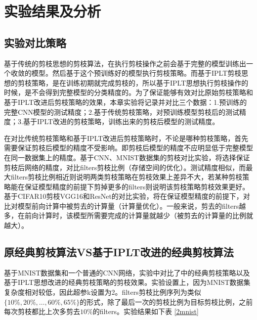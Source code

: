\documentclass[ pdftex, oneside, master]{NJUthesis}
\begin{document}
\section{实验结果及分析} \label{2result}

\subsection{实验对比策略}

基于传统的剪枝思想的剪枝算法，在执行剪枝操作之前会基于完整的模型训练出一个收敛的模型。然后基于这个预训练好的模型执行剪枝策略。而基于IPLT剪枝思想的剪枝策略，是在训练初期就完成剪枝的，所以基于IPLT思想执行剪枝操作的时候，是不会得到完整模型的分类精度的。为了保证能够有效对比原始剪枝策略和基于IPLT改进后剪枝策略的效果，本章实验将记录并对比三个数据：1.预训练的完整CNN模型的测试精度；2.基于传统剪枝策略，对预训练模型剪枝后的测试精度；3.基于IPLT改进的剪枝策略，训练出来的剪枝后模型的测试精度。

在对比传统剪枝策略和基于IPLT改进后剪枝策略时，不论是哪种剪枝策略，首先需要保证剪枝后模型的精度不受影响。即剪枝后模型的精度不应明显低于完整模型在同一数据集上的精度。基于CNN、MNIST数据集的剪枝对比实验，将选择保证剪枝后网络的精度，对比filters剪枝比例（存储空间的优化）。测试精度相似，而最大filters剪枝比例相近则说明两类剪枝策略在剪枝效果上差异不大，若某种剪枝策略能在保证模型精度的前提下剪掉更多的filters则说明该剪枝策略剪枝效果更好。基于CIFAR10剪枝VGG16和ResNet的对比实验，将在保证模型精度的前提下，对比对模型前向计算中被剪去的计算量（计算量优化）。一般来说，剪去的filters越多，在前向计算时，该模型所需要完成的计算量就越少（被剪去的计算量的比例就越大）。

\subsection{原经典剪枝算法VS基于IPLT改进的经典剪枝算法} \label{norm_pruning}

基于MNIST数据集和一个普通的CNN网络，实验中对比了\cite{17}中的经典剪枝策略以及基于IPLT思想改进的经典剪枝策略的剪枝效果。实验设置上，因为MNIST数据集复杂度相对较低，因此超参k设置为2。filters剪枝比例序列为类似$\{10\%, 20\%, \dots, 60\%, 65\%\}$的形式，除了最后一次的剪枝比例为目标剪枝比例，之前每次剪枝都比上次多剪去$10\%$的filters。实验结果如下表 \ref{2mnist}
\end{document}
